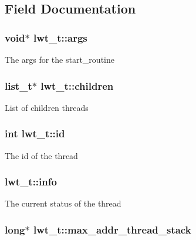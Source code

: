 \subsection{Field Documentation}
\hypertarget{structlwt_a6e870b21b996bc5c62b6cbd04328e784}{
\subsubsection[{args}]{\setlength{\rightskip}{0pt plus 5cm}void$\ast$ lwt\+\_\+t\+::args}}\label{structlwt_a6e870b21b996bc5c62b6cbd04328e784}
The args for the start\+\_\+routine \hypertarget{structlwt_aea6931811e4b99f909101d0f6f86cb59}{
\subsubsection[{children}]{\setlength{\rightskip}{0pt plus 5cm}list\+\_\+t$\ast$ lwt\+\_\+t\+::children}}\label{structlwt_aea6931811e4b99f909101d0f6f86cb59}
List of children threads \hypertarget{structlwt_aa3df3d76d606756e38bb9bd3d2c2d241}{
\subsubsection[{id}]{\setlength{\rightskip}{0pt plus 5cm}int lwt\+\_\+t\+::id}}\label{structlwt_aa3df3d76d606756e38bb9bd3d2c2d241}
The id of the thread \hypertarget{structlwt_a40641e751624b983f5e1ae5302210e5d}{
\subsubsection[{info}]{ lwt\+\_\+t\+::info}}\label{structlwt_a40641e751624b983f5e1ae5302210e5d}
The current status of the thread \hypertarget{structlwt_ae97cdce617ee026378588f57a999f972}{
\subsubsection[{max\+\_\+addr\+\_\+thread\+\_\+stack}]{\setlength{\rightskip}{0pt plus 5cm}long$\ast$ lwt\+\_\+t\+::max\+\_\+addr\+\_\+thread\+\_\+stack}}\label{structlwt_ae97cdce617ee026378588f57a999f972}
